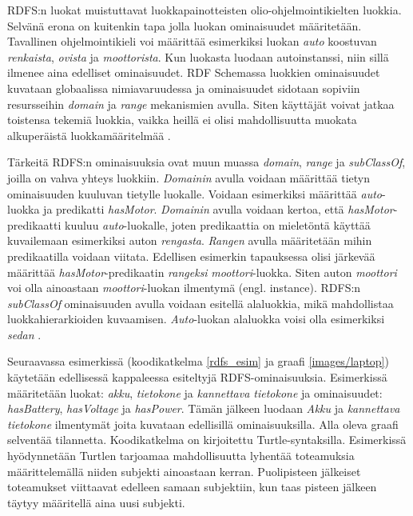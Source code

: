 \documentclass[finnish, 12pt, a4paper, elec, utf8, pdfa, online]{aaltothesis}
\begin{document}
{%
RDFS:n luokat muistuttavat luokkapainotteisten olio-ohjelmointikielten luokkia. Selvänä erona on kuitenkin tapa jolla luokan ominaisuudet määritetään. Tavallinen ohjelmointikieli voi määrittää esimerkiksi luokan \textit{auto} koostuvan \textit{renkaista}, \textit{ovista} ja \textit{moottorista}. Kun luokasta luodaan autoinstanssi, niin sillä ilmenee aina edelliset ominaisuudet. RDF Schemassa luokkien ominaisuudet kuvataan globaalissa nimiavaruudessa ja ominaisuudet sidotaan sopiviin resursseihin \textit{domain} ja \textit{range} mekanismien avulla. Siten käyttäjät voivat jatkaa toistensa tekemiä luokkia, vaikka heillä ei olisi mahdollisuutta muokata alkuperäistä luokkamääritelmää \cite{Antoniou} \cite{W3C_RDFS2}.

Tärkeitä RDFS:n ominaisuuksia ovat muun muassa \textit{domain}, \textit{range} ja \textit{subClassOf}, joilla on vahva yhteys luokkiin. \textit{Domainin} avulla voidaan määrittää tietyn ominaisuuden kuuluvan tietylle luokalle. Voidaan esimerkiksi määrittää \textit{auto}-luokka ja predikatti \textit{hasMotor}. \textit{Domainin} avulla voidaan kertoa, että \textit{hasMotor}-predikaatti kuuluu \textit{auto}-luokalle, joten predikaattia on mieletöntä käyttää kuvailemaan esimerkiksi auton \textit{rengasta}. \textit{Rangen} avulla määritetään mihin predikaatilla voidaan viitata. Edellisen esimerkin tapauksessa olisi järkevää määrittää \textit{hasMotor}-predikaatin \textit{rangeksi} \textit{moottori}-luokka. Siten auton \textit{moottori} voi olla ainoastaan \textit{moottori}-luokan ilmentymä (engl. instance). RDFS:n \textit{subClassOf} ominaisuuden avulla voidaan esitellä alaluokkia, mikä mahdollistaa luokkahierarkioiden kuvaamisen. \textit{Auto}-luokan alaluokka voisi olla esimerkiksi \textit{sedan}
\cite{W3C_RDFS2}.

Seuraavassa esimerkissä (koodikatkelma \ref{rdfs_esim} ja graafi \ref{images/laptop}) käytetään edellisessä kappaleessa esiteltyjä RDFS-ominaisuuksia. Esimerkissä määritetään luokat: \textit{akku}, \textit{tietokone} ja \textit{kannettava tietokone} ja ominaisuudet: \textit{hasBattery}, \textit{hasVoltage} ja \textit{hasPower}. Tämän jälkeen luodaan \textit{Akku} ja \textit{kannettava tietokone} ilmentymät joita kuvataan edellisillä ominaisuuksilla. Alla oleva graafi selventää tilannetta. Koodikatkelma on kirjoitettu Turtle-syntaksilla. Esimerkissä hyödynnetään Turtlen tarjoamaa mahdollisuutta lyhentää toteamuksia määrittelemällä niiden subjekti ainoastaan kerran. Puolipisteen jälkeiset toteamukset viittaavat edelleen samaan subjektiin, kun taas pisteen jälkeen täytyy määritellä aina uusi subjekti.

}
\end{document}
